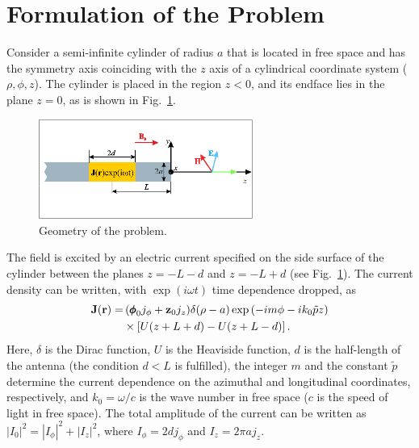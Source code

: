 \documentclass[summary]{URSIGASS2020}
\begin{document}
\section{Formulation of the Problem}

Consider a semi-infinite cylinder of radius $ a $ that is located in free space and has the symmetry axis coinciding with the $ z $ axis of a cylindrical coordinate system ($ \rho, \phi, z $).
The cylinder is placed in the region $ z<0 $, and its endface lies in the plane $ z=0 $, as is shown in Fig.~\ref{geometry}.
\begin{figure}[htbp]%
	\centering
	\includegraphics[width=70mm]{figures/fig1.eps}
	\caption{Geometry of the problem.}
	\label{geometry}
\end{figure}
The field is excited by an electric current specified on the side surface of the cylinder between the planes $ z=-L-d $ and $ z=-L+d $ (see Fig.~\ref{geometry}). The current density can be written, with $ \exp(i\omega t) $ time dependence dropped, as
\begin{align} \label{source_eq}
{\bf J}({\bf r})=&\,({\pmb\phi}_{0}j_{\phi}+{\bf z}_0j_z)\delta(\rho-a)
\exp\left(-im\phi-ik_0{\tilde p}z\right) \nonumber \\
&\times\left[U(z+L+d)-U(z+L-d)\right].
\end{align} 
Here, $ \delta $ is the Dirac function, $ U $ is the Heaviside function, $ d $ is the half-length of the antenna (the condition $ d<L $ is fulfilled), the integer $ m $ and the constant $ \tilde p $ determine the current dependence on the azimuthal and longitudinal coordinates, respectively, and $ k_0=\omega/c $ is the wave number in free space ($ c $  is the speed of light in free space).
The total amplitude of the current can be written as  $ |I_0|^2=|I_\phi|^2+|I_z|^2 $, where $ I_\phi=2dj_{\phi} $ and $ I_z=2\pi aj_z $.
\end{document}
